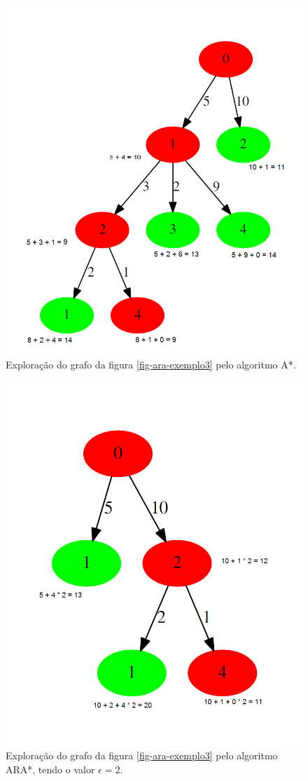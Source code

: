 \begin{figure}[H]
\centering
\includegraphics[width=.70\textwidth]{figuras/ARA-exemplo1} 
\caption{Exploração do grafo da figura \ref{fig-ara-exemplo3} pelo algoritmo A*.}
\label{fig-ara-exemplo1}
\end{figure}

\begin{figure}[H]
\centering
\includegraphics[width=.70\textwidth]{figuras/ARA-exemplo2} 
\caption{Exploração do grafo da figura \ref{fig-ara-exemplo3} pelo algoritmo ARA*, tendo o valor $\epsilon = 2$.}
\label{fig-ara-exemplo2}
\end{figure}

